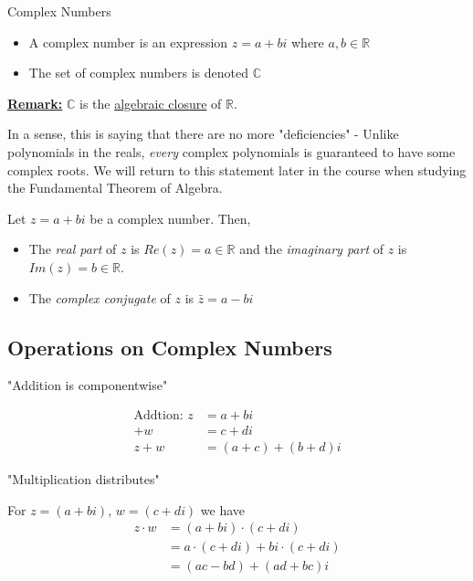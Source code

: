 \documentclass{article}
\begin{document}
\begin{mathdefinitionbox}{Complex Numbers}
  \begin{itemize}
  \item A complex number is an expression $z = a + bi$ where $a, b \in \mathbb{R}$
  \item The set of complex numbers is denoted $\mathbb{C}$
  \end{itemize}
\end{mathdefinitionbox}
\vskip 0.5cm

\underline{\textbf{Remark:}} $\mathbb{C}$ is the \underline{algebraic closure} of $\mathbb{R}$. 

\vskip 0.5cm
In a sense, this is saying that there are no more "deficiencies" - Unlike polynomials in the reals, \emph{every} complex polynomials is guaranteed to have some complex roots. We will return to this statement later in the course when studying the Fundamental Theorem of Algebra.

\vskip 0.5cm
Let $z = a + bi$ be a complex number. Then, 
\begin{itemize}
  \item The \emph{real part} of $z$ is $Re(z) = a \in \mathbb{R}$ and the \emph{imaginary part} of $z$ is $Im(z) = b \in \mathbb{R}$.
  \item The \emph{complex conjugate} of $z$ is $\bar{z} = a - bi$
\end{itemize} 

\vskip 0.5cm
\subsection{Operations on Complex Numbers}

"Addition is componentwise"

\begin{align*}
  \text{Addtion: } z &= a + bi \\
                  +w &= c + di \\
              z+w&=(a+c) + (b+d)i
\end{align*}

\vskip 0.5cm
"Multiplication distributes"

For $z = (a + bi)$, $w = (c + di)$ we have 
\begin{align*}
  z \cdot w &= (a + bi) \cdot (c + di) \\
            &= a \cdot (c + di) + bi \cdot (c + di) \\
            &= (ac - bd) + (ad + bc)i
\end{align*}
\end{document}

